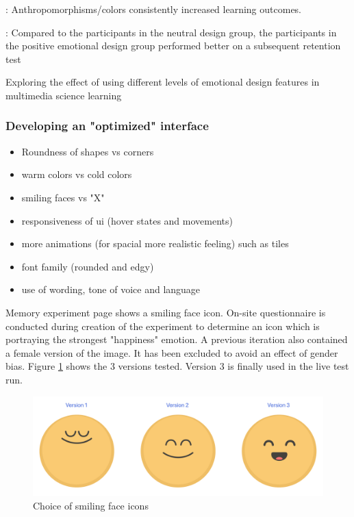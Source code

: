 	\cite{Brom2018}: Anthropomorphisms/colors consistently increased learning outcomes.
	
	\cite{Le2018}: Compared to the participants in the neutral design group, the participants in the positive emotional design group performed better on a subsequent retention test
	
	\cite{Uzun2018} Exploring the effect of using different levels of emotional design features in multimedia science learning


	
	
	\subsubsection{Developing an "optimized" interface}
	
	
	\begin{itemize}
		\item Roundness of shapes vs corners
		\item warm colors vs cold colors
		\item smiling faces vs "X"
		\item responsiveness of ui (hover states and movements)
		\item more animations (for spacial more realistic feeling) such as tiles
		\item font family (rounded and edgy)
		\item use of wording, tone of voice and language \cite{Hancock2007}
	\end{itemize}

	Memory experiment page shows a smiling face icon. On-site questionnaire is conducted during creation of the experiment to determine an icon which is portraying the strongest "happiness" emotion. A previous iteration also contained a female version of the image. It has been excluded to avoid an effect of gender bias. Figure \ref{fig:smiling-icons} shows the 3 versions tested. Version 3 is finally used in the live test run.
	
	\begin{figure}[h]
		\centering
		\includegraphics[width=0.7\linewidth]{graphics/smiling-icons}
		\caption{Choice of smiling face icons}
		\label{fig:smiling-icons}
	\end{figure}
	

